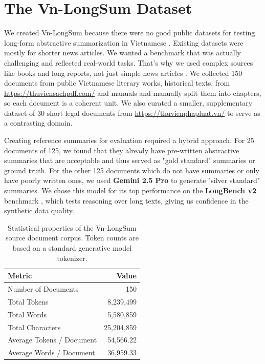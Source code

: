 \documentclass[11pt]{article}
\begin{document}
\section{The Vn-LongSum Dataset}
\label{sec:dataset}

We created Vn-LongSum because there were no good public datasets for testing long-form abstractive summarization in Vietnamese \citep{lam2022vietnamese}. Existing datasets were mostly for shorter news articles. We wanted a benchmark that was actually challenging and reflected real-world tasks. That's why we used complex sources like books and long reports, not just simple news articles \citep{koh2022survey}. We collected 150 documents from public Vietnamese literary works, historical texts, from \url{https://thuviensachpdf.com/} and manuals and manually split them into chapters, so each document is a coherent unit. We also curated a smaller, supplementary dataset of 30 short legal documents from \url{https://thuvienphapluat.vn/} to serve as a contrasting domain.

Creating reference summaries for evaluation required a hybrid approach. For 25 documents of 125, we found that they already have pre-written abstractive summaries that are acceptable and thus served as "gold standard" summaries or ground truth. For the other 125 documents which do not have summaries or only have poorly written ones, we used \textbf{Gemini 2.5 Pro} to generate "silver standard" summaries. We chose this model for its top performance on the \textbf{LongBench v2} benchmark \citep{bai2024longbenchv2}, which tests reasoning over long texts, giving us confidence in the synthetic data quality.



\begin{table}[h]
\centering
\begin{tabular}{lr}
\toprule
\textbf{Metric} & \textbf{Value} \\
\midrule
Number of Documents & 150 \\
Total Tokens & 8,239,499 \\
Total Words & 5,580,859 \\
Total Characters & 25,204,859 \\
Average Tokens / Document & 54,566.22 \\
Average Words / Document & 36,959.33 \\
\bottomrule
\end{tabular}
\caption{Statistical properties of the Vn-LongSum source document corpus. Token counts are based on a standard generative model tokenizer.}
\label{tab:dataset_stats}
\end{table}
\end{document}
